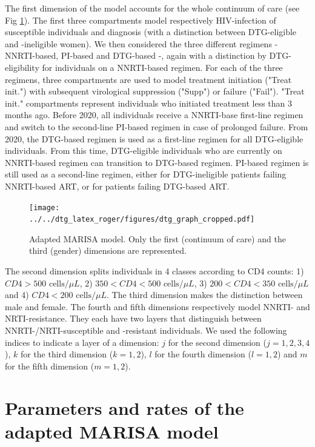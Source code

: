 \documentclass{article}
\begin{document}
The first dimension of the model accounts for the whole continuum of care (see Fig \ref{figure1}). The first three compartments model respectively HIV-infection of susceptible individuals and diagnosis (with a distinction between DTG-eligible and -ineligible women). We then considered the three different regimens - NNRTI-based, PI-based and DTG-based -, again with a distinction by DTG-eligibility for individuals on a NNRTI-based regimen. For each of the three regimens, three compartments are used to model treatment initiation ("Treat init.") with subsequent virological suppression ("Supp") or failure ("Fail").
"Treat init." compartments represent individuals who initiated treatment less than 3 months ago. Before 2020, all individuals receive a NNRTI-base first-line regimen and switch to the second-line PI-based regimen in case of prolonged failure. From 2020, the DTG-based regimen is used as a first-line regimen for all DTG-eligible individuals. From this time, DTG-eligible individuals who are currently on NNRTI-based regimen can transition to DTG-based regimen. PI-based regimen is still used as a second-line regimen, either for DTG-ineligible patients failing NNRTI-based ART, or for patients failing DTG-based ART.

\begin{figure}[h]
   \texttt{[image: ../../dtg\_latex\_roger/figures/dtg\_graph\_cropped.pdf]}
   \caption{Adapted MARISA model. Only the first (continuum of care) and the third (gender) dimensions are represented.}\label{figure1}
\end{figure}

The second dimension splits individuals in 4 classes according to CD4 counts: 1) $CD4>500 \text{ cells}/\mu L$, 2) $350<CD4<500 \text{ cells}/\mu L$, 3) $200<CD4<350  \text{ cells}/\mu L$ and 4) $CD4<200  \text{ cells}/\mu L$.  The third dimension makes the distinction between male and female. The fourth and fifth dimensions respectively model NNRTI- and NRTI-resistance. They each have two layers that distinguish between NNRTI-/NRTI-susceptible and -resistant individuals. We used the following indices to indicate a layer of a dimension: $j$ for the second dimension ($j=1,2,3,4$), $k$ for the third dimension ($k=1,2$), $l$ for the fourth dimension ($l=1,2$) and $m$ for the fifth dimension ($m=1,2$).
\newpage
\section{Parameters and rates of the adapted MARISA model}
\end{document}
